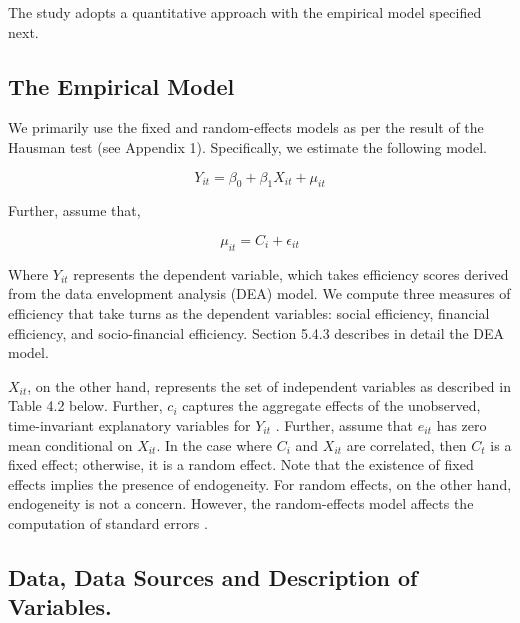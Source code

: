 \documentclass[a4paper, nobind]{templates/ociamthesis}
\begin{document}
The study adopts a quantitative approach with the empirical model specified next.

\hypertarget{the-empirical-model}{%
\subsection{The Empirical Model}\label{the-empirical-model}}

We primarily use the fixed and random-effects models as per the result of the Hausman test (see Appendix 1). Specifically, we estimate the following model.

\begin{equation}
Y_{it} = \beta_{0} + \beta_{1}X_{it} + \mu_{it}
\end{equation}

Further, assume that,

\begin{equation}
\mu_{it} = C_{i} + \epsilon_{it}
\end{equation}

Where \(Y_{it}\) represents the dependent variable, which takes efficiency scores derived from the data envelopment analysis (DEA) model. We compute three measures of efficiency that take turns as the dependent variables: social efficiency, financial efficiency, and socio-financial efficiency. Section 5.4.3 describes in detail the DEA model.

\(X_{it}\), on the other hand, represents the set of independent variables as described in Table 4.2 below. Further, \(c_{i}\) captures the aggregate effects of the unobserved, time-invariant explanatory variables for \(Y_{it}\) . Further, assume that \(e_{it}\) has zero mean conditional on \(X_{it}\). In the case where \(C_{i}\) and \(X_{it}\) are correlated, then \(C_{t}\) is a fixed effect; otherwise, it is a random effect. Note that the existence of fixed effects implies the presence of endogeneity. For random effects, on the other hand, endogeneity is not a concern. However, the random-effects model affects the computation of standard errors \autocite{roberts2013endogeneity}.

\hypertarget{data-data-sources-and-description-of-variables.}{%
\subsection{Data, Data Sources and Description of Variables.}\label{data-data-sources-and-description-of-variables.}}
\end{document}
